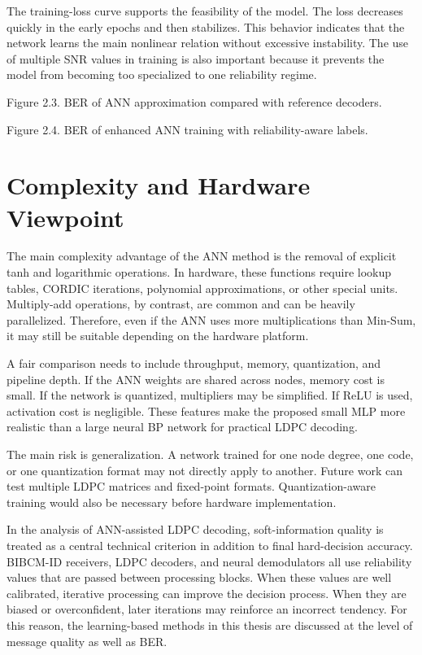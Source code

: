 The training-loss curve supports the feasibility of the model. The loss decreases quickly in the early epochs and then stabilizes. This behavior indicates that the network learns the main nonlinear relation without excessive instability. The use of multiple SNR values in training is also important because it prevents the model from becoming too specialized to one reliability regime.

Figure 2.3. BER of ANN approximation compared with reference decoders.

Figure 2.4. BER of enhanced ANN training with reliability-aware labels.

\section{Complexity and Hardware Viewpoint}
The main complexity advantage of the ANN method is the removal of explicit tanh and logarithmic operations. In hardware, these functions require lookup tables, CORDIC iterations, polynomial approximations, or other special units. Multiply-add operations, by contrast, are common and can be heavily parallelized. Therefore, even if the ANN uses more multiplications than Min-Sum, it may still be suitable depending on the hardware platform.

A fair comparison needs to include throughput, memory, quantization, and pipeline depth. If the ANN weights are shared across nodes, memory cost is small. If the network is quantized, multipliers may be simplified. If ReLU is used, activation cost is negligible. These features make the proposed small MLP more realistic than a large neural BP network for practical LDPC decoding.

The main risk is generalization. A network trained for one node degree, one code, or one quantization format may not directly apply to another. Future work can test multiple LDPC matrices and fixed-point formats. Quantization-aware training would also be necessary before hardware implementation.

In the analysis of ANN-assisted LDPC decoding, soft-information quality is treated as a central technical criterion in addition to final hard-decision accuracy. BIBCM-ID receivers, LDPC decoders, and neural demodulators all use reliability values that are passed between processing blocks. When these values are well calibrated, iterative processing can improve the decision process. When they are biased or overconfident, later iterations may reinforce an incorrect tendency. For this reason, the learning-based methods in this thesis are discussed at the level of message quality as well as BER.

